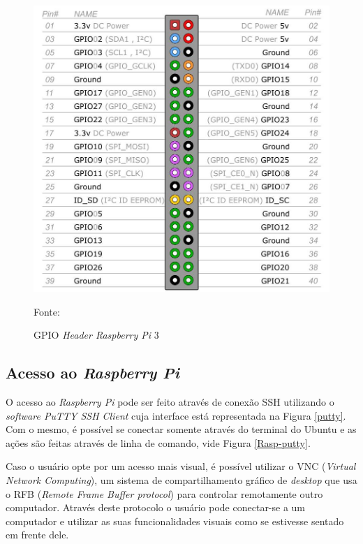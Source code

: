 \documentclass[
12pt,
openany, %
oneside, %
a4paper,			
english,			
brazil			        %
]{abntbibufjf}
\begin{document}
    \begin{figure}[!htb]
		\centering
		\includegraphics[scale=0.4]{Figuras/pi3_gpio.jpg}
		\caption{GPIO \textit{Header Raspberry Pi} 3}
		\label{GPIO}
		\par Fonte: \cite{ELEMENT}
	\end{figure}
	
	
	\subsection{Acesso ao \textit{Raspberry Pi}}
	
	O acesso ao \textit{Raspberry Pi} pode ser feito através de conexão SSH utilizando o \textit{software PuTTY SSH Client} cuja interface está representada na Figura \ref{putty}. Com o mesmo, é possível se conectar somente através do terminal do Ubuntu e as ações são feitas através de linha de comando, vide Figura \ref{Rasp-putty}.
	
	Caso o usuário opte por um acesso mais visual, é possível utilizar o VNC (\textit{Virtual Network Computing}),  um sistema de compartilhamento gráfico de \textit{desktop} que usa o RFB (\textit{Remote Frame Buffer protocol}) para controlar remotamente outro computador. Através deste protocolo o usuário pode conectar-se a um computador e utilizar as suas funcionalidades visuais como se estivesse sentado em frente dele.
	
\end{document}
